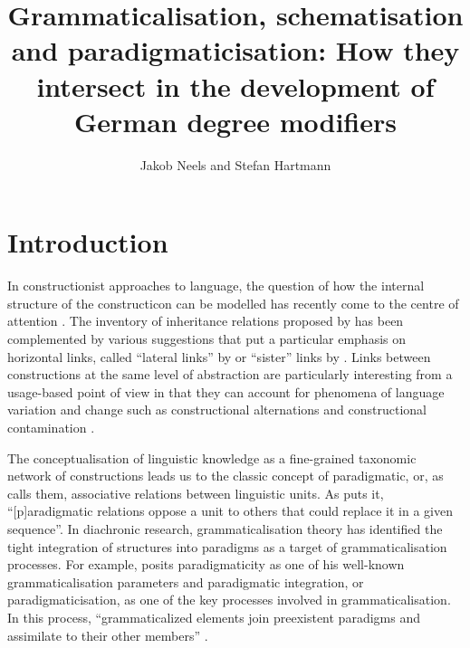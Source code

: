 \documentclass[output=paper]{langsci/langscibook}
\author{Jakob Neels\affiliation{Leipzig University} and Stefan Hartmann\affiliation{{University of Düsseldorf}}}
\title[Grammaticalisation, schematisation and paradigmaticisation]{Grammaticalisation, schematisation and paradigmaticisation: How they intersect in the development of German degree modifiers}
\begin{document}
\maketitle


\section{Introduction} \label{introduction}
In constructionist approaches to language, the question of how the internal structure of the constructicon can be modelled has recently come to the centre of attention \citep[see e.g.][]{DiesselGrammarNetworkHow2019, SommererSmirnova2020}. The inventory of inheritance relations proposed by \citet[][]{GoldbergConstructionsConstructionGrammar1995} has been complemented by various suggestions that put a particular emphasis on horizontal links, called “lateral links” by \citet{NordeDerivationcategorychange2018}  or “sister” links by \citet{AudringMotherssistersencoding2019}. Links between constructions at the same level of abstraction are particularly interesting from a usage-based point of view in that they can account for phenomena of language variation and change such as constructional alternations \citet{PerekArgumentstructureusagebased2015} and constructional contamination \citep{PijpopsConstructionalcontaminationHow2016, PijpopsConstructionalcontaminationmorphology2018}.

The conceptualisation of linguistic knowledge as a fine-grained taxonomic network of constructions leads us to the classic concept of paradigmatic, or, as \citet{SaussureCoursLinguistiqueGenerale1916} calls them, associative relations between linguistic units. As \citet[174]{BodenParadigmvssyntagm2005} puts it, “[p]aradigmatic relations oppose a unit to others that could replace it in a given sequence”. In diachronic research, grammaticalisation theory has identified the tight integration of structures into paradigms as a target of grammaticalisation processes. For example, \citet{LehmannThoughtsGrammaticalization2015}  posits paradigmaticity as one of his well-known grammaticalisation parameters and paradigmatic integration, or paradigmaticisation, as one of the key processes involved in grammaticalisation. In this process, “grammaticalized elements join preexistent paradigms and assimilate to their other members” \citep[144]{LehmannThoughtsGrammaticalization2015}.
\end{document}

